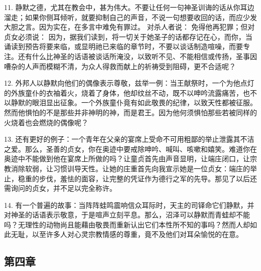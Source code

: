 11. 静默之德，尤其在教会中，甚为伟大。不要让任何一句神圣训诲的话从你耳边溜走；如果你侧耳倾听，就要抑制自己的声音，不说一句想要收回的话，而应少发大胆之言。因为实在，在多言中难免有罪过。 对杀人者说： 免得他再犯罪；但对贞女必须说： 因为，据我们读到，将一切关于她圣子的话都存记在心，而你，当诵读到预告将要来临，或显明祂已来临的章节时，不要以谈话制造喧噪，而要专注。还有什么比神圣的话语被谈话所淹没，以致听不见、不能相信或传扬，圣事因嘈杂的人声而模糊不清，为众人得救而献上的祈祷受到阻碍，更不合适呢？\par

12. 外邦人以静默向他们的偶像表示尊敬，兹举一例：当王献祭时，一个为他点灯的外族童仆的衣袖着火，烧着了身体，他却纹丝不动，既不以呻吟流露痛苦，也不以静默的眼泪显出征象。一个外族童仆竟有如此敬畏的纪律，以致天性都被征服。然而他惧怕的不是那些并非神明的神，而是君王。因为他何须惧怕那些若被同样的火烧着也会燃烧的偶像呢？\par

13. 还有更好的例子：一个青年在父亲的宴席上受命不可用粗鄙的举止泄露其不洁之爱。那么，圣善的贞女，你在奥迹中要戒除呻吟、喊叫、咳嗽和嬉笑。难道你在奥迹中不能做到他在宴席上所做的吗？让童贞首先由声音显明，让端庄闭口，让宗教消除软弱，让习惯训导天性。让她的庄重首先向我宣示她是一位贞女：端庄的举止，稳重的步伐，羞怯的面容，让完整的凭证作为德行之军的先导。那见了以后还需询问的贞女，并不足以完全称许。\par

14. 有一个普遍的故事：当阵阵蛙鸣震响信众耳际时，天主的司铎命它们静默，并对神圣的话语表示敬意，于是喧声立刻平息。那么，沼泽可以静默而青蛙却不能吗？无理性的动物尚且能藉由敬畏而重新认出它们本性所不知的事吗？然而人却如此无耻，以至许多人对心灵宗教情感的尊重，竟不及他们对耳朵愉悦的在意。\par


\subsection{第四章}

\par

